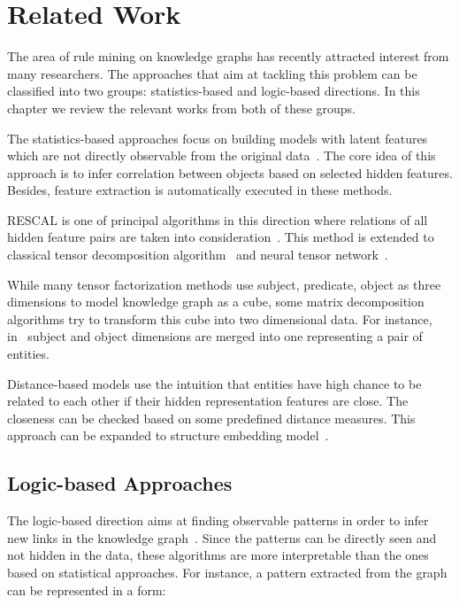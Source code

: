 \chapter{Related Work}

The area of rule mining on knowledge graphs has recently attracted interest from many researchers. The approaches that aim at tackling this problem can be classified into two groups: statistics-based and logic-based directions. In this chapter we review the relevant works from both of these groups.

The statistics-based approaches focus on building models with latent features which are not directly observable from the original data~\cite{ref1}. The core idea of this approach is to infer correlation between objects based on selected hidden features. Besides, feature extraction is automatically executed in these methods.

RESCAL is one of principal algorithms in this direction where relations of all hidden feature pairs are taken into consideration~\cite{ref2, ref3}. This method is extended to classical tensor decomposition algorithm~\cite{ref4} and neural tensor network~\cite{ref5}.

While many tensor factorization methods use subject, predicate, object as three dimensions to model knowledge graph as a cube, some matrix decomposition algorithms try to transform this cube into two dimensional data. For instance, in~\cite{ref6, ref7} subject and object dimensions are merged into one representing a pair of entities.

Distance-based models use the intuition that entities have high chance to be related to each other if their hidden representation features are close. The closeness can be checked based on some predefined distance measures. This approach can be expanded to structure embedding model~\cite{ref8}.

\section{Logic-based Approaches}

The logic-based direction aims at finding observable patterns in order to infer new links in the knowledge graph~\cite{ref1}. Since the patterns can be directly seen and not hidden in the data, these algorithms are more interpretable than the ones based on statistical approaches. For instance, a pattern extracted from the graph can be represented in a form:\\

